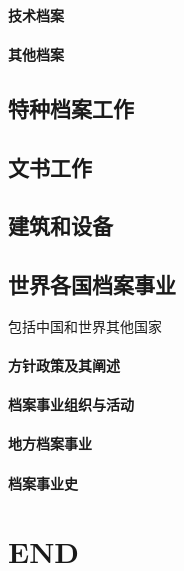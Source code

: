 \documentclass[UTF8]{../../ApplicationUniverse}
\begin{document}
    \subsubsection{技术档案}
    \subsubsection{其他档案}
\section{特种档案工作}
\section{文书工作}
\section{建筑和设备}

\section{世界各国档案事业}
包括中国和世界其他国家
\subsubsection{方针政策及其阐述}
\subsubsection{档案事业组织与活动}
\subsubsection{地方档案事业}
\subsubsection{档案事业史}
 


\chapter{END}
\end{document}
